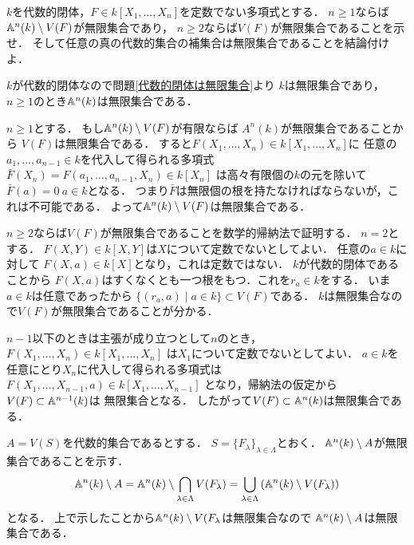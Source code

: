 \begin{prob}
  $k$を代数的閉体，$F\in k[X_1,\dots,X_n]$を定数でない多項式とする．
  $n\ge 1$ならば$\mathbb{A}^n(k) \setminus V(F)$が無限集合であり，
  $n\ge 2$ならば$V(F)$が無限集合であることを示せ．
  そして任意の真の代数的集合の補集合は無限集合であることを結論付けよ．
\end{prob}
\begin{ans}
  $k$が代数的閉体なので問題\ref{代数的閉体は無限集合}より
  $k$は無限集合であり，$n\ge 1$のとき$\mathbb{A}^n(k)$は無限集合である．
  
  $n\ge 1$とする．
  もし$\mathbb{A}^n(k) \setminus V(F)$が有限ならば
  $A^n(k)$が無限集合であることから
  $V(F)$は無限集合である．
  すると$F(X_1,\dots, X_n) \in k[X_1,\dots,X_n]$に
  任意の$a_1,\dots,a_{n-1} \in k$を代入して得られる多項式
  $\bar{F}(X_n) = F(a_1,\dots ,a_{n-1}, X_n) \in k[X_n]$
  は高々有限個の$k$の元を除いて$\bar{F}(a) = 0 \ a\in k$となる．
  つまり$\bar{F}$は無限個の根を持たなければならないが，これは不可能である．
  よって$\mathbb{A}^n(k) \setminus V(F)$は無限集合である．

  $n\ge 2$ならば$V(F)$が無限集合であることを数学的帰納法で証明する．
  $n = 2$とする．
  $F(X,Y) \in k[X,Y]$は$X$について定数でないとしてよい．
  任意の$a \in k$に対して
  $F(X,a) \in k[X]$となり，これは定数ではない．
  $k$が代数的閉体であることから
  $F(X,a)$はすくなくとも一つ根をもつ．これを$r_a \in k$をする．
  いま$a\in k$は任意であったから
  $ \{ (r_a, a) \mid a \in k \} \subset V(F) $である．
  $k$は無限集合なので$V(F)$が無限集合であることが分かる．
  
  $n-1$以下のときは主張が成り立つとして$n$のとき，
  $F(X_1, \dots, X_n) \in k[X_1,\dots,X_n]$
  は$X_1$について定数でないとしてよい．
  $a \in k$を任意にとり$X_n$に代入して得られる多項式は
  $F(X_1, \dots, X_{n-1}, a) \in k[X_1,\dots,X_{n-1}]$
  となり，帰納法の仮定から$V(F) \subset \mathbb{A}^{n-1}(k)$は
  無限集合となる．
  したがって$V(F) \subset \mathbb{A}^n(k)$は無限集合である．

  $A = V(S)$を代数的集合であるとする．
  $S = \{ F_{\lambda} \}_{\lambda\in\Lambda}$とおく．
  $\mathbb{A}^n(k) \setminus A$が無限集合であることを示す．
  \[ \mathbb{A}^n(k) \setminus A
  = \mathbb{A}^n(k) \setminus \bigcap_{\lambda\in\Lambda} V(F_{\lambda})
  = \bigcup_{\lambda\in\Lambda} \left( \mathbb{A}^n(k) \setminus V(F_{\lambda}) \right) \]
  となる．
  上で示したことから$\mathbb{A}^n(k) \setminus V(F_{\lambda}$は無限集合なので
  $ \mathbb{A}^n(k) \setminus A$は無限集合である．
\end{ans}
